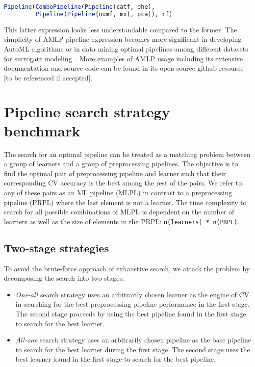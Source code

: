 \documentclass{juliacon}
\begin{document}
\begin{lstlisting}[language = Julia,numbers=none]
Pipeline(ComboPipeline(Pipeline(catf, ohe),
         Pipeline(Pipeline(numf, mx), pca)), rf)
\end{lstlisting}

\vskip 6pt

This latter expression looks less understandable compared to the former. The
simplicity of AMLP pipeline expression becomes more significant in developing
AutoML algorithms or in data mining optimal pipelines among  different datasets
for surrogate modeling~\cite{avatar2020}.  More examples of AMLP usage
including its extensive documentation and source code can be found in its
open-source github resource [to be referenced if accepted].

\section{Pipeline search strategy benchmark}

The search for an optimal pipeline can be treated as a matching problem between a
group of learners and a group of preprocessing pipelines.  The objective is to
find the optimal pair of preprocessing pipeline and learner such that their
corresponding CV accuracy is the best among the rest of the
pairs.  We refer to any of these pairs as an ML pipeline (MLPL) in contrast to a
preprocessing pipeline (PRPL) where the last element is not a learner.  The
time complexity to search for all possible combinations of MLPL is dependent on
the number of learners as well as the size of elements in the PRPL:
\texttt{n(learners)~*~n(PRPL)}.

\subsection{Two-stage strategies}

To avoid the brute-force approach of exhaustive search, we attack the problem
by decomposing the search into two stages:

\begin{itemize}
  \item \emph{One-all} search strategy uses an arbitrarily
     chosen learner as the    engine of
    CV in searching for the best preprocessing pipeline performance
    in the first stage. The second stage proceeds by
    using the best pipeline found in
    the first stage to search for the best learner.
  \item \emph{All-one} search strategy uses an
    arbitrarily chosen pipeline as the base pipeline
    to search for the best
    learner during the first stage. The second stage
    uses the best learner found in the first
    stage to search for the best pipeline.
\end{itemize}
\end{document}
